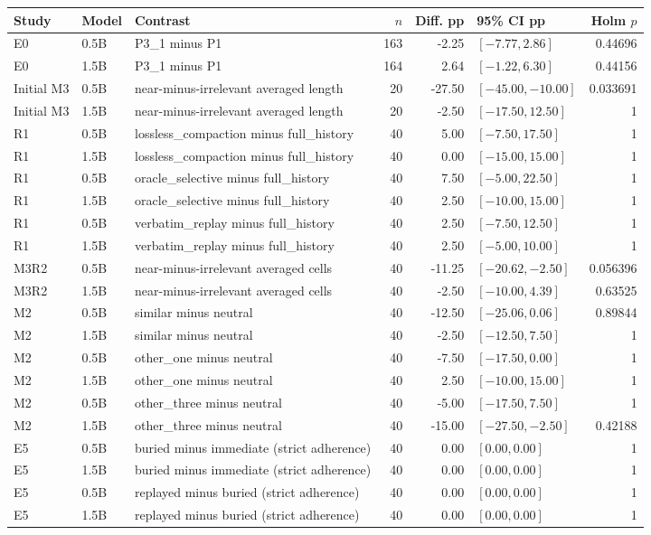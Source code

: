 \begin{longtable}{p{.075\linewidth}p{.065\linewidth}p{.26\linewidth}rrp{.18\linewidth}r}
\toprule Study & Model & Contrast & $n$ & Diff. pp & 95\% CI pp & Holm $p$ \\
\midrule
E0 & 0.5B & P3\_1 minus P1 & 163 & -2.25 & $[-7.77, 2.86]$ & 0.44696 \\
E0 & 1.5B & P3\_1 minus P1 & 164 & 2.64 & $[-1.22, 6.30]$ & 0.44156 \\
Initial M3 & 0.5B & near-minus-irrelevant averaged length & 20 & -27.50 & $[-45.00, -10.00]$ & 0.033691 \\
Initial M3 & 1.5B & near-minus-irrelevant averaged length & 20 & -2.50 & $[-17.50, 12.50]$ & 1 \\
R1 & 0.5B & lossless\_compaction minus full\_history & 40 & 5.00 & $[-7.50, 17.50]$ & 1 \\
R1 & 1.5B & lossless\_compaction minus full\_history & 40 & 0.00 & $[-15.00, 15.00]$ & 1 \\
R1 & 0.5B & oracle\_selective minus full\_history & 40 & 7.50 & $[-5.00, 22.50]$ & 1 \\
R1 & 1.5B & oracle\_selective minus full\_history & 40 & 2.50 & $[-10.00, 15.00]$ & 1 \\
R1 & 0.5B & verbatim\_replay minus full\_history & 40 & 2.50 & $[-7.50, 12.50]$ & 1 \\
R1 & 1.5B & verbatim\_replay minus full\_history & 40 & 2.50 & $[-5.00, 10.00]$ & 1 \\
M3R2 & 0.5B & near-minus-irrelevant averaged cells & 40 & -11.25 & $[-20.62, -2.50]$ & 0.056396 \\
M3R2 & 1.5B & near-minus-irrelevant averaged cells & 40 & -2.50 & $[-10.00, 4.39]$ & 0.63525 \\
M2 & 0.5B & similar minus neutral & 40 & -12.50 & $[-25.06, 0.06]$ & 0.89844 \\
M2 & 1.5B & similar minus neutral & 40 & -2.50 & $[-12.50, 7.50]$ & 1 \\
M2 & 0.5B & other\_one minus neutral & 40 & -7.50 & $[-17.50, 0.00]$ & 1 \\
M2 & 1.5B & other\_one minus neutral & 40 & 2.50 & $[-10.00, 15.00]$ & 1 \\
M2 & 0.5B & other\_three minus neutral & 40 & -5.00 & $[-17.50, 7.50]$ & 1 \\
M2 & 1.5B & other\_three minus neutral & 40 & -15.00 & $[-27.50, -2.50]$ & 0.42188 \\
E5 & 0.5B & buried minus immediate (strict adherence) & 40 & 0.00 & $[0.00, 0.00]$ & 1 \\
E5 & 1.5B & buried minus immediate (strict adherence) & 40 & 0.00 & $[0.00, 0.00]$ & 1 \\
E5 & 0.5B & replayed minus buried (strict adherence) & 40 & 0.00 & $[0.00, 0.00]$ & 1 \\
E5 & 1.5B & replayed minus buried (strict adherence) & 40 & 0.00 & $[0.00, 0.00]$ & 1 \\
\bottomrule
\end{longtable}
